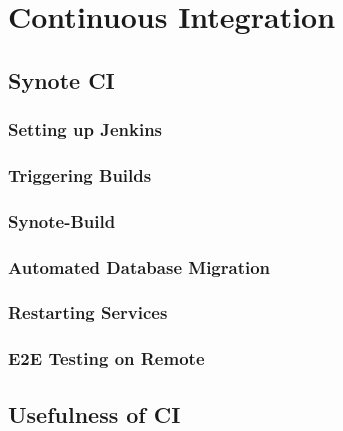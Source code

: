 \chapter{Continuous Integration}
\label{chap:continuous-integration}

\section{Synote CI}
\label{sec:synote-ci}

\subsection{Setting up Jenkins}
\label{subsec:setting-up-jenkins}

\subsection{Triggering Builds}
\label{subsec:triggering-builds}

\subsection{Synote-Build}
\label{subsec:synote-build}

\subsection{Automated Database Migration}
\label{subsec:automated-database-migration}

\subsection{Restarting Services}
\label{subsec:restarting-services}

\subsection{E2E Testing on Remote}
\label{subsec:e2e-testing-on-remote}

\section{Usefulness of CI}
\label{sec:usefulness-of-ci}